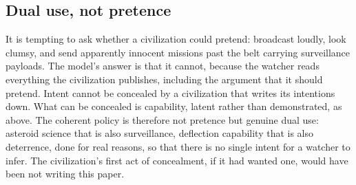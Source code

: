 \documentclass[preprint,12pt]{elsarticle}
\theoremstyle{definition}
\begin{document}
\subsection{Dual use, not pretence}
\label{sec:dualuse}

It is tempting to ask whether a civilization could pretend: broadcast loudly, look clumsy, and send apparently innocent missions past the belt carrying surveillance payloads. The model's answer is that it cannot, because the watcher reads everything the civilization publishes, including the argument that it should pretend. Intent cannot be concealed by a civilization that writes its intentions down. What can be concealed is capability, latent rather than demonstrated, as above. The coherent policy is therefore not pretence but genuine dual use: asteroid science that is also surveillance, deflection capability that is also deterrence, done for real reasons, so that there is no single intent for a watcher to infer. The civilization's first act of concealment, if it had wanted one, would have been not writing this paper.
\end{document}
